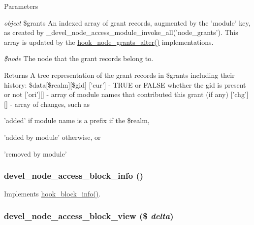 \begin{DoxyParams}{Parameters}
\item[{\em object}]\$grants An indexed array of grant records, augmented by the 'module' key, as created by \_\-devel\_\-node\_\-access\_\-module\_\-invoke\_\-all('node\_\-grants'). This array is updated by the \hyperlink{group__node__access_ga21e95e2bd0b4ed12d861aa83426a8ba3}{hook\_\-node\_\-grants\_\-alter()} implementations.\item[{\em \$node}]The node that the grant records belong to.\end{DoxyParams}
\begin{DoxyReturn}{Returns}
A tree representation of the grant records in \$grants including their history: \$data\mbox{[}\$realm\mbox{]}\mbox{[}\$gid\mbox{]} \mbox{[}'cur'\mbox{]} -\/ TRUE or FALSE whether the gid is present or not \mbox{[}'ori'\mbox{]}\mbox{[}\mbox{]} -\/ array of module names that contributed this grant (if any) \mbox{[}'chg'\mbox{]}\mbox{[}\mbox{]} -\/ array of changes, such as
\begin{DoxyItemize}
\item 'added' if module name is a prefix if the \$realm,
\item 'added by module' otherwise, or
\item 'removed by module' 
\end{DoxyItemize}
\end{DoxyReturn}
\hypertarget{devel__node__access_8module_a2e24b01fdced9c434e1b8471835db857}{
\subsubsection[{devel\_\-node\_\-access\_\-block\_\-info}]{\setlength{\rightskip}{0pt plus 5cm}devel\_\-node\_\-access\_\-block\_\-info ()}}
\label{devel__node__access_8module_a2e24b01fdced9c434e1b8471835db857}
Implements \hyperlink{group__hooks_ga2bd926c3e90deeba0c3ba64fb3c64d73}{hook\_\-block\_\-info()}. \hypertarget{devel__node__access_8module_a0394c90f9987f4c074827f8bb366e3d0}{
\subsubsection[{devel\_\-node\_\-access\_\-block\_\-view}]{\setlength{\rightskip}{0pt plus 5cm}devel\_\-node\_\-access\_\-block\_\-view (\$ {\em delta})}}
